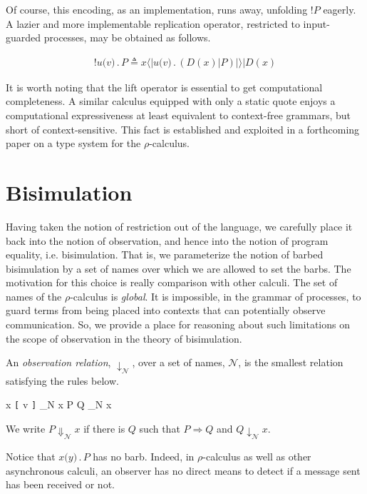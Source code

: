 \documentclass[]{entcs}
\newcommand{\lliftb}{\langle\!|}
\newcommand{\rliftb}{|\!\rangle}
\newcommand{\id}[1]{\texttt{#1}}
\newcommand{\juxtap}{\mathbin{\id{|}}}
\newcommand{\concat}{\mathbin{.}}
\newcommand{\nameeq}{\mathbin{\equiv_N}}
\newcommand{\binpar}[2]{#1 \juxtap #2}
\newcommand{\outputp}[2]{#1 \id{[} #2 \id{]}}
\newcommand{\prefix}[3]{#1 \id{(} #2 \id{)} \concat #3}
\newcommand{\lift}[2]{#1 \lliftb #2 \rliftb}
\newcommand{\bangp}[1]{\id{!} #1}
\newcommand{\wred}{\Rightarrow}
\newcommand{\rhoc}{$\rho$-calculus}
\begin{document}
Of course, this encoding, as an implementation, runs away, unfolding
$\bangp{P}$ eagerly. A lazier and more implementable replication
operator, restricted to input-guarded processes, may be obtained as follows.

\begin{eqnarray}
\bangp{\prefix{u}{v}{P}} 
	\triangleq 
	\binpar{\lift{x}{\prefix{u}{v}{(\binpar{D(x)}{P})}}}{D(x)} \nonumber
\end{eqnarray}

It is worth noting that the lift operator is essential to get
computational completeness. A similar calculus equipped with only a
static quote enjoys a computational expressiveness at least equivalent
to context-free grammars, but short of context-sensitive. This fact is
established and exploited in a forthcoming paper on a type system for
the {\rhoc}.

\section{Bisimulation}

Having taken the notion of restriction out of the language, we
carefully place it back into the notion of observation, and hence into
the notion of program equality, i.e. bisimulation. That is, we
parameterize the notion of barbed bisimulation by a set of names over
which we are allowed to set the barbs. The motivation for this choice
is really comparison with other calculi. The set of names of the
{\rhoc} is \textit{global}. It is impossible, in the grammar of
processes, to guard terms from being placed into contexts that can
potentially observe communication. So, we provide a place for
reasoning about such limitations on the scope of observation in the
theory of bisimulation.

\begin{definition}
An \emph{observation relation}, $\downarrow_{\mathcal N}$, over a set
of names, $\mathcal N$, is the smallest relation satisfying the rules
below.

\infrule[Out-barb]{y \in {\mathcal N}, \; x \nameeq y}
		  {\outputp{x}{v} \downarrow_{\mathcal N} x}
		  {\binpar{P}{Q} \downarrow_{\mathcal N} x}

We write $P \Downarrow_{\mathcal N} x$ if there is $Q$ such that 
$P \wred Q$ and $Q \downarrow_{\mathcal N} x$.
\end{definition}

Notice that $\prefix{x}{y}{P}$ has no barb.  Indeed, in {\rhoc} as well
as other asynchronous calculi, an observer has no direct means to
detect if a message sent has been received or not.
\end{document}

